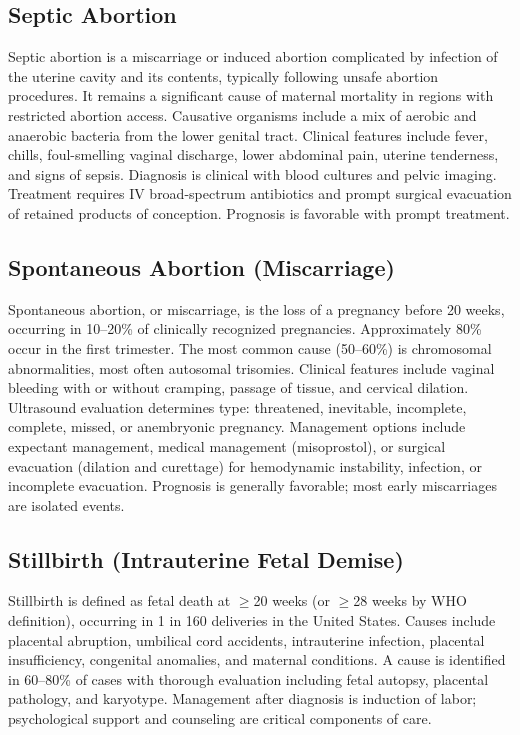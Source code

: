 \subsection{Septic Abortion}
\label{sec:Septic Abortion}
Septic abortion is a miscarriage or induced abortion complicated by infection of the uterine cavity and its contents, typically following unsafe abortion procedures. It remains a significant cause of maternal mortality in regions with restricted abortion access. Causative organisms include a mix of aerobic and anaerobic bacteria from the lower genital tract. Clinical features include fever, chills, foul-smelling vaginal discharge, lower abdominal pain, uterine tenderness, and signs of sepsis. Diagnosis is clinical with blood cultures and pelvic imaging. Treatment requires IV broad-spectrum antibiotics and prompt surgical evacuation of retained products of conception. Prognosis is favorable with prompt treatment.

\subsection{Spontaneous Abortion (Miscarriage)}
\label{sec:Spontaneous Abortion}
Spontaneous abortion, or miscarriage, is the loss of a pregnancy before 20 weeks, occurring in 10--20\% of clinically recognized pregnancies. Approximately 80\% occur in the first trimester. The most common cause (50--60\%) is chromosomal abnormalities, most often autosomal trisomies. Clinical features include vaginal bleeding with or without cramping, passage of tissue, and cervical dilation. Ultrasound evaluation determines type: threatened, inevitable, incomplete, complete, missed, or anembryonic pregnancy. Management options include expectant management, medical management (misoprostol), or surgical evacuation (dilation and curettage) for hemodynamic instability, infection, or incomplete evacuation. Prognosis is generally favorable; most early miscarriages are isolated events.

\subsection{Stillbirth (Intrauterine Fetal Demise)}
\label{sec:Stillbirth}
Stillbirth is defined as fetal death at $\ge$20 weeks (or $\ge$28 weeks by WHO definition), occurring in 1 in 160 deliveries in the United States. Causes include placental abruption, umbilical cord accidents, intrauterine infection, placental insufficiency, congenital anomalies, and maternal conditions. A cause is identified in 60--80\% of cases with thorough evaluation including fetal autopsy, placental pathology, and karyotype. Management after diagnosis is induction of labor; psychological support and counseling are critical components of care.

